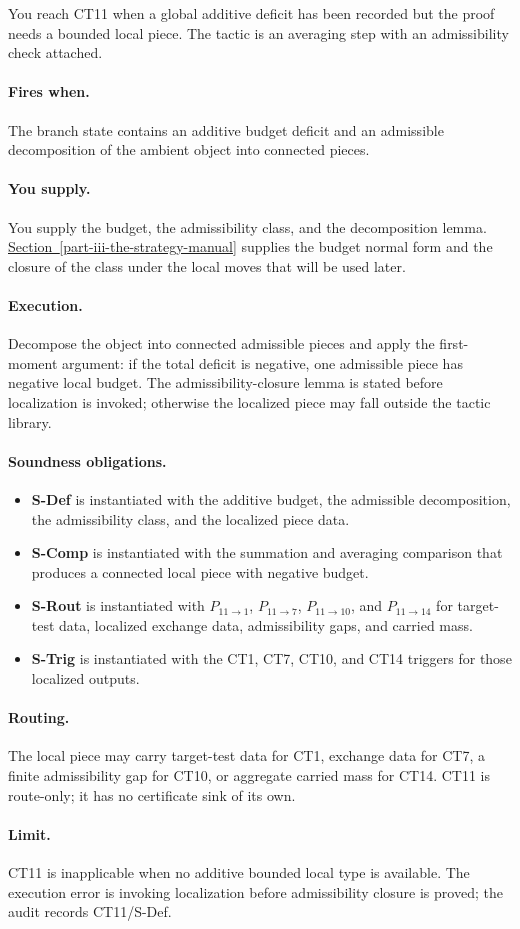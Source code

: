 \documentclass[
  11pt,
]{article}
\providecommand{\tightlist}{%
  \setlength{\itemsep}{0pt}\setlength{\parskip}{0pt}}
\theoremstyle{definition}
\newcommand{\secref}[1]{\hyperref[#1]{Section~\ref*{#1}}}
\newcommand{\ctpar}[1]{\paragraph{#1.}}
\begin{document}
You reach CT11 when a global additive deficit has been recorded but the
proof needs a bounded local piece.  The tactic is an averaging step with
an admissibility check attached.

\ctpar{Fires when}
The branch state contains an additive budget deficit and an admissible
decomposition of the ambient object into connected pieces.

\ctpar{You supply}
You supply the budget, the admissibility class, and the decomposition
lemma.  \secref{part-iii-the-strategy-manual} supplies the budget normal form and the closure of the
class under the local moves that will be used later.

\ctpar{Execution}
Decompose the object into connected admissible pieces and apply the
first-moment argument: if the total deficit is negative, one admissible
piece has negative local budget.  The admissibility-closure lemma is
stated before localization is invoked; otherwise the localized piece may
fall outside the tactic library.

\ctpar{Soundness obligations}
\begin{itemize}
\tightlist
\item \textbf{S-Def} is instantiated with the additive budget, the admissible decomposition, the admissibility class, and the localized piece data.
\item \textbf{S-Comp} is instantiated with the summation and averaging comparison that produces a connected local piece with negative budget.
\item \textbf{S-Rout} is instantiated with \(P_{11\to1}\), \(P_{11\to7}\), \(P_{11\to10}\), and \(P_{11\to14}\) for target-test data, localized exchange data, admissibility gaps, and carried mass.
\item \textbf{S-Trig} is instantiated with the CT1, CT7, CT10, and CT14 triggers for those localized outputs.
\end{itemize}

\ctpar{Routing}
The local piece may carry target-test data for CT1, exchange data for
CT7, a finite admissibility gap for CT10, or aggregate carried mass for
CT14.  CT11 is route-only; it has no certificate sink of its own.

\ctpar{Limit}
CT11 is inapplicable when no additive bounded local type is available. The
execution error is invoking localization before admissibility closure is
proved; the audit records CT11/S-Def.
\end{document}
